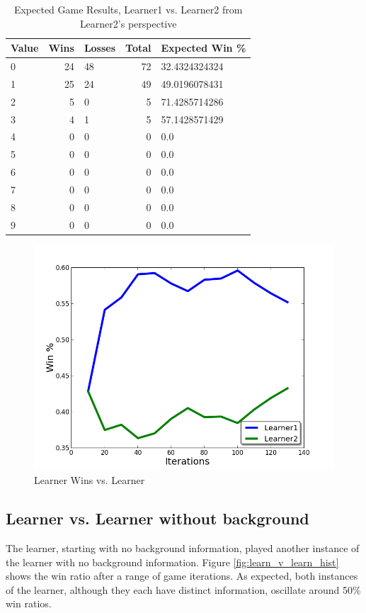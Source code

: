 \documentclass[12pt,pdftex]{article}
\begin{document}
\begin{table}[hb!]
\centering
\begin{tabular}{| l | r | l | r | l |}
	\hline
 \textbf{Value} & \textbf{Wins}& \textbf{Losses}& \textbf{Total}& \textbf{Expected Win \%}\\
\hline
0& 24& 48& 72& 32.4324324324\\
1& 25& 24& 49& 49.0196078431\\
2& 5& 0& 5& 71.4285714286\\
3& 4& 1& 5& 57.1428571429\\
4& 0& 0& 0& 0.0\\
5& 0& 0& 0& 0.0\\
6& 0& 0& 0& 0.0\\
7& 0& 0& 0& 0.0\\
8& 0& 0& 0& 0.0\\
9& 0& 0& 0& 0.0\\
\hline
\end{tabular}
\caption{Expected Game Results, Learner1 vs. Learner2 from Learner2's perspective}
\label{tab:learner2_v_learner}
\end{table}

\begin{figure}[ht!]
	\begin{center}
		\includegraphics[scale=0.5]{figs/learnervlearner.png}
		\caption{Learner Wins vs. Learner}
		\label{fig:learn_v_learn}
\end{center}
\end{figure}

\subsection{Learner vs. Learner without background}
The learner, starting with no background information, played another instance of the learner with no background information.
Figure \ref{fig:learn_v_learn_hist} shows the win ratio after a range of game iterations.
As expected, both instances of the learner, although they each have distinct information, oscillate around 50\% win ratios.
\end{document}
